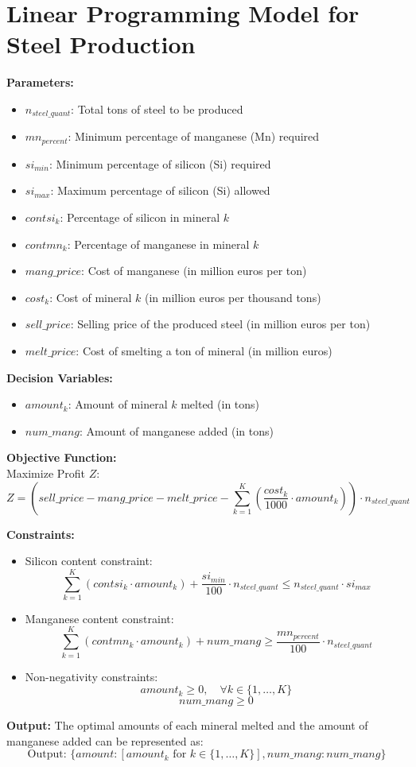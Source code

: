 \documentclass{article}
\begin{document}
\section*{Linear Programming Model for Steel Production}

\textbf{Parameters:}
\begin{itemize}
    \item $n_{steel\_quant}$: Total tons of steel to be produced
    \item $mn_{percent}$: Minimum percentage of manganese (Mn) required
    \item $si_{min}$: Minimum percentage of silicon (Si) required
    \item $si_{max}$: Maximum percentage of silicon (Si) allowed
    \item $contsi_k$: Percentage of silicon in mineral $k$
    \item $contmn_k$: Percentage of manganese in mineral $k$
    \item $mang\_price$: Cost of manganese (in million euros per ton)
    \item $cost_k$: Cost of mineral $k$ (in million euros per thousand tons)
    \item $sell\_price$: Selling price of the produced steel (in million euros per ton)
    \item $melt\_price$: Cost of smelting a ton of mineral (in million euros)
\end{itemize}

\textbf{Decision Variables:}
\begin{itemize}
    \item $amount_k$: Amount of mineral $k$ melted (in tons)
    \item $num\_mang$: Amount of manganese added (in tons)
\end{itemize}

\textbf{Objective Function:} \\
Maximize Profit $Z$:
\[
Z = (sell\_price - mang\_price - melt\_price - \sum_{k=1}^{K} \left( \frac{cost_k}{1000} \cdot amount_k \right)) \cdot n_{steel\_quant}
\]

\textbf{Constraints:}
\begin{itemize}
    \item Silicon content constraint:
    \[
    \sum_{k=1}^{K} (contsi_k \cdot amount_k) + \frac{si_{min}}{100} \cdot n_{steel\_quant} \leq n_{steel\_quant} \cdot si_{max}
    \]
    
    \item Manganese content constraint:
    \[
    \sum_{k=1}^{K} (contmn_k \cdot amount_k) + num\_mang \geq \frac{mn_{percent}}{100} \cdot n_{steel\_quant}
    \]
    
    \item Non-negativity constraints:
    \[
    amount_k \geq 0, \quad \forall k \in \{1, \ldots, K\}
    \]
    \[
    num\_mang \geq 0
    \]
    
\end{itemize}

\textbf{Output:}
The optimal amounts of each mineral melted and the amount of manganese added can be represented as:
\[
\text{Output: } \{amount: [amount_k \text{ for } k \in \{1,\ldots,K\}], num\_mang: num\_mang\}
\]
\end{document}
